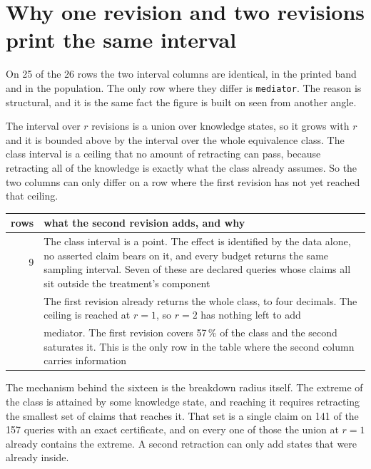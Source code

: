 \clearpage
\section{Why one revision and two revisions print the same interval}

On 25 of the 26 rows the two interval columns are identical, in the printed band and in the
population. The only row where they differ is \texttt{mediator}. The reason is structural, and it is the same
fact the figure is built on seen from another angle.

The interval over $r$ revisions is a union over knowledge states, so it grows with $r$ and it is
bounded above by the interval over the whole equivalence class. The class interval is a ceiling that
no amount of retracting can pass, because retracting all of the knowledge is exactly what the class
already assumes. So the two columns can only differ on a row where the first revision has not yet
reached that ceiling.

\begin{center}\small
\begin{tabular}{@{}rp{12.6cm}@{}}
\toprule
rows & what the second revision adds, and why \\
\midrule
9 & The class interval is a point. The effect is identified by the data alone, no asserted claim
bears on it, and every budget returns the same sampling interval. Seven of these are declared
queries whose claims all sit outside the treatment's component \\
\addlinespace
16 & The first revision already returns the whole class, to four decimals. The ceiling is reached at
$r = 1$, so $r = 2$ has nothing left to add \\
\addlinespace
1 & mediator. The first revision covers 57\,\% of the class and the second saturates it.
This is the only row in the table where the second column carries information \\
\bottomrule
\end{tabular}
\end{center}

The mechanism behind the sixteen is the breakdown radius itself. The extreme of the class is
attained by some knowledge state, and reaching it requires retracting the smallest set of claims
that reaches it. That set is a single claim on 141 of the 157 queries with an exact certificate, and
on every one of those the union at $r = 1$ already contains the extreme. A second retraction can
only add states that were already inside.


